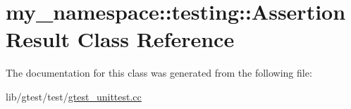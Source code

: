 \hypertarget{classmy__namespace_1_1testing_1_1_assertion_result}{\section{my\-\_\-namespace\-:\-:testing\-:\-:Assertion\-Result Class Reference}
\label{classmy__namespace_1_1testing_1_1_assertion_result}
}


The documentation for this class was generated from the following file\-:\begin{DoxyCompactItemize}
\item 
lib/gtest/test/\hyperlink{gtest__unittest_8cc}{gtest\-\_\-unittest.\-cc}\end{DoxyCompactItemize}
